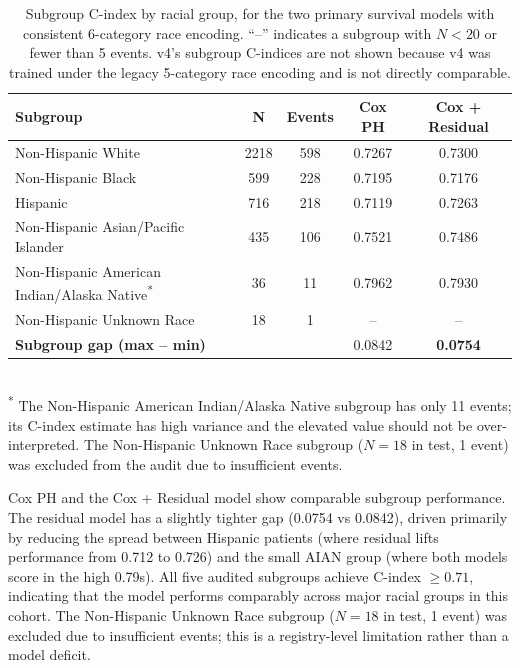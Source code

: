 \documentclass[12pt, letterpaper]{article}
\begin{document}
\begin{table}[h!]
\centering
\caption{Subgroup C-index by racial group, for the two primary survival models with consistent 6-category race encoding. ``--'' indicates a subgroup with $N < 20$ or fewer than 5 events. v4's subgroup C-indices are not shown because v4 was trained under the legacy 5-category race encoding and is not directly comparable.}
\label{tab:fairness}
\begin{tabular}{@{}lcccc@{}}
\toprule
\textbf{Subgroup} & \textbf{N} & \textbf{Events} & \textbf{Cox PH} & \textbf{Cox + Residual} \\
\midrule
Non-Hispanic White                        & 2218 & 598 & 0.7267 & 0.7300 \\
Non-Hispanic Black                        & 599  & 228 & 0.7195 & 0.7176 \\
Hispanic                                  & 716  & 218 & 0.7119 & 0.7263 \\
Non-Hispanic Asian/Pacific Islander       & 435  & 106 & 0.7521 & 0.7486 \\
Non-Hispanic American Indian/Alaska Native\textsuperscript{*} & 36 & 11 & 0.7962 & 0.7930 \\
Non-Hispanic Unknown Race                 & 18   & 1   & --     & --     \\
\midrule
\textbf{Subgroup gap (max -- min)}        &      &     & 0.0842 & \textbf{0.0754} \\
\bottomrule
\end{tabular}
\\[2pt]
\footnotesize\textsuperscript{*} The Non-Hispanic American Indian/Alaska Native subgroup has only 11 events; its C-index estimate has high variance and the elevated value should not be over-interpreted. The Non-Hispanic Unknown Race subgroup ($N=18$ in test, 1 event) was excluded from the audit due to insufficient events.
\end{table}

Cox PH and the Cox + Residual model show comparable subgroup performance. The residual model has a slightly tighter gap (0.0754 vs 0.0842), driven primarily by reducing the spread between Hispanic patients (where residual lifts performance from 0.712 to 0.726) and the small AIAN group (where both models score in the high 0.79s). All five audited subgroups achieve C-index $\geq 0.71$, indicating that the model performs comparably across major racial groups in this cohort. The Non-Hispanic Unknown Race subgroup ($N=18$ in test, 1 event) was excluded due to insufficient events; this is a registry-level limitation rather than a model deficit.
\end{document}
